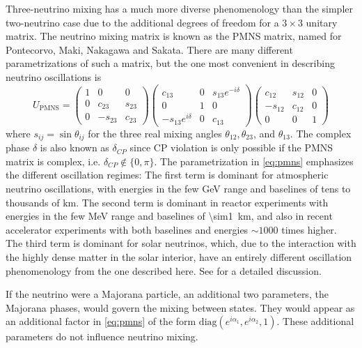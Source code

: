 Three-neutrino mixing has a much more diverse phenomenology
than the simpler two-neutrino case
due to the additional degrees of freedom for a $3\times3$ unitary matrix.
The neutrino mixing matrix is known as the PMNS matrix,
named for Pontecorvo, Maki, Nakagawa and Sakata.
There are many different parametrizations of such a matrix,
but the one most convenient in describing neutrino oscillations is
\begin{equation}\label{eq:pmns}
    U_{\text{PMNS}} =
    \begin{pmatrix}
        1 & 0 & 0 \\
        0 & c_{23} & s_{23} \\
        0 & -s_{23} & c_{23}
    \end{pmatrix}
    \begin{pmatrix}
        c_{13} & 0 & s_{13}e^{-i\delta} \\
        0 & 1 & 0 \\
        -s_{13}e^{i\delta} & 0 & c_{13}
    \end{pmatrix}
    \begin{pmatrix}
        c_{12} & s_{12} & 0 \\
        -s_{12} & c_{12} & 0 \\
        0 & 0 & 1
    \end{pmatrix}
\end{equation}
where $s_{ij} = \sin\theta_{ij}$ for the three real mixing angles
$\theta_{12},\theta_{23}$, and $\theta_{13}$.
The complex phase $\delta$ is also known as $\delta_{CP}$
since CP violation is only possible if the PMNS matrix is complex,
i.e. $\delta_{CP} \notin \{0, \pi\}$.
The parametrization in \cref{eq:pmns} emphasizes the different oscillation regimes:
The first term is dominant for atmospheric neutrino oscillations,
with energies in the few \si{\GeV} range
and baselines of tens to thousands of \si{\km}.
The second term is dominant in reactor experiments
with energies in the few \si{\MeV} range
and baselines of \SI{\sim1}{\km},
and also in recent accelerator experiments
with both baselines and energies $\sim1000$ times higher.
The third term is dominant for solar neutrinos,
which, due to the interaction with the highly dense matter in the solar interior,
have an entirely different oscillation phenomenology from the one described here.
See \cite{neutrino_textbook} for a detailed discussion.

If the neutrino were a Majorana particle,
an additional two parameters, the Majorana phases,
would govern the mixing between states.
They would appear as an additional factor in \cref{eq:pmns}
of the form $\text{diag}(e^{i\alpha_1}, e^{i\alpha_2}, 1)$.
These additional parameters do not influence neutrino mixing.

